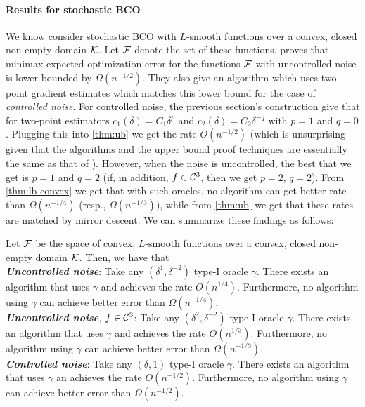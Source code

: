 \paragraph{Results for stochastic BCO}
We know consider stochastic BCO with $L$-smooth functions over a convex, closed non-empty domain $\mathcal{K}$. 
Let $\mathcal{F}$ denote the set of these functions.
\cite{duchi2015optimal} proves that minimax expected optimization error
for the functions $\mathcal{F}$ with uncontrolled noise is lower bounded by $\Omega(n^{-1/2})$. 
They also give an algorithm which uses two-point gradient estimates which matches this lower bound for the case of \emph{controlled noise}.
For controlled noise, the previous section's construction give that for two-point estimators $c_1(\delta) = C_1 \delta^p$ and $c_2(\delta) = C_2\delta^{-q}$ with $p=1$ and $q=0$. Plugging this into
\cref{thm:ub} we get the rate $O(n^{-1/2})$ (which is unsurprising
given that the algorithms and the upper bound proof techniques are essentially the same as that of \cite{duchi2015optimal}).
However, when the noise is uncontrolled, the best that we get is $p=1$ and $q=2$ (if, in addition, $f\in \mathcal{C}^3$, then we get $p=2$, $q=2$).
From \cref{thm:lb-convex} we get that with such oracles, no algorithm can get better rate than $\Omega(n^{-1/4})$ (resp., $\Omega(n^{-1/3})$), while from
\cref{thm:ub} we get that these rates are matched by mirror descent.
We can summarize these findings as follows:
\begin{theorem}\label{thm:aaab}
Let $\mathcal{F}$ be the space of convex, $L$-smooth functions over a convex, closed non-empty domain $\mathcal{K}$.
Then, we have that\\
\textit{\textbf{Uncontrolled noise}}:
Take any $(\delta^1,\delta^{-2})$ type-I oracle $\gamma$.
There exists an algorithm that uses $\gamma$
and achieves the rate $O(n^{1/4})$.
Furthermore, no algorithm using $\gamma$
 can achieve better error than $\Omega(n^{-1/4})$.\\
\textit{\textbf{Uncontrolled noise}, $f\in \mathcal{C}^3$}:
Take any $(\delta^2,\delta^{-2})$ type-I oracle $\gamma$.
There exists an algorithm that uses $\gamma$
and achieves the rate $O(n^{1/3})$.
Furthermore, no algorithm using $\gamma$
 can achieve better error than $\Omega(n^{-1/3})$.\\
\textit{\textbf{Controlled noise}}:
Take any $(\delta,1)$ type-I oracle $\gamma$.
There exists an algorithm that uses $\gamma$ an
achieves the rate $O(n^{-1/2})$.
Furthermore, no algorithm using $\gamma$
 can achieve better error than $\Omega(n^{-1/2})$.
\end{theorem}


